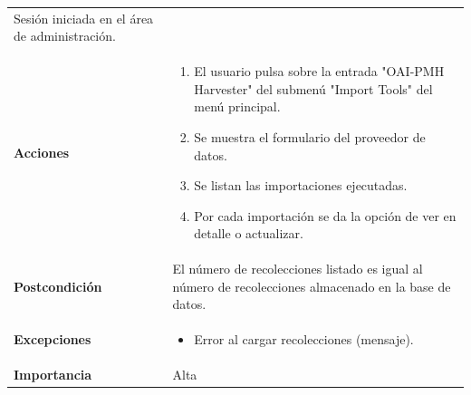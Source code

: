 \documentclass[
]{article}
\providecommand{\tightlist}{%
  \setlength{\itemsep}{0pt}\setlength{\parskip}{0pt}}
\begin{document}
\begin{longtable}[]{@{}ll@{}}
\begin{minipage}[t]{0.75\columnwidth}
Sesión iniciada en el área de administración.\strut
\end{minipage}\tabularnewline
\begin{minipage}[t]{0.19\columnwidth}\raggedright
\textbf{Acciones}\strut
\end{minipage} & \begin{minipage}[t]{0.75\columnwidth}\raggedright
\begin{enumerate}
\def\labelenumi{\arabic{enumi}.}
\tightlist
\item
  El usuario pulsa sobre la entrada "OAI-PMH Harvester" del submenú
  "Import Tools" del menú principal.
\item
  Se muestra el formulario del proveedor de datos.
\item
  Se listan las importaciones ejecutadas.
\item
  Por cada importación se da la opción de ver en detalle o actualizar.
\end{enumerate}\strut
\end{minipage}\tabularnewline
\begin{minipage}[t]{0.19\columnwidth}\raggedright
\textbf{Postcondición}\strut
\end{minipage} & \begin{minipage}[t]{0.75\columnwidth}\raggedright
El número de recolecciones listado es igual al número de recolecciones
almacenado en la base de datos.\strut
\end{minipage}\tabularnewline
\begin{minipage}[t]{0.19\columnwidth}\raggedright
\textbf{Excepciones}\strut
\end{minipage} & \begin{minipage}[t]{0.75\columnwidth}\raggedright
\begin{itemize}
\tightlist
\item
  Error al cargar recolecciones (mensaje).
\end{itemize}\strut
\end{minipage}\tabularnewline
\begin{minipage}[t]{0.19\columnwidth}\raggedright
\textbf{Importancia}\strut
\end{minipage} & \begin{minipage}[t]{0.75\columnwidth}\raggedright
Alta\strut
\end{minipage}\tabularnewline
\bottomrule
\end{longtable}
\end{document}

